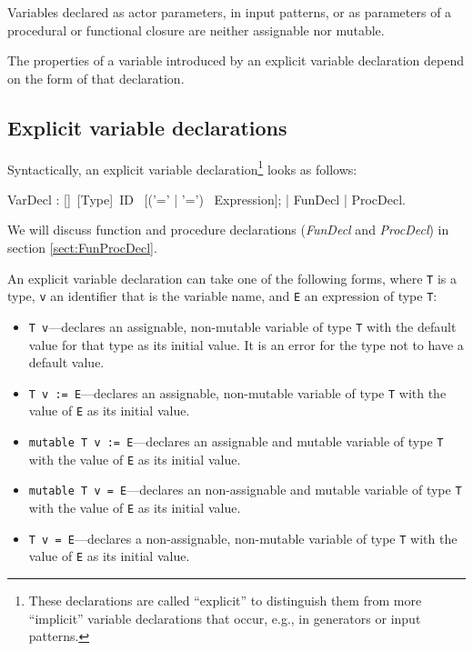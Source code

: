 Variables declared as actor parameters, in input patterns, or as
parameters of a procedural or functional closure are
neither assignable nor mutable.

The properties of a variable introduced by an explicit variable
declaration depend on the form of that declaration.

\subsection{Explicit variable declarations}\label{sect:ExplicitVarDecl}


Syntactically, an explicit variable declaration\footnote{These
  declarations are called ``explicit'' to distinguish them from more
  ``implicit'' variable declarations that occur, e.g., in generators
  or input patterns.} looks as follows:


\bgr
  VarDecl : [\kwMutable]~[Type]~ID ~[('=' | '\charColon=')
  ~Expression];
  | FunDecl | ProcDecl.
\egr


We will discuss function and procedure declarations ({\em FunDecl} and
{\em ProcDecl}) in section \ref{sect:FunProcDecl}.

An explicit variable declaration can take one of
the following forms, where {\tt T} is a type, {\tt v} an identifier
that is the variable name, and {\tt E} an expression of type {\tt T}:
\begin{itemize}
\item {\tt T v}---declares an assignable, non-mutable variable of type
  {\tt T} with the default value for that type as its initial
  value. It is an error for the type not to have a default value.
\item {\tt T v := E}---declares an assignable, non-mutable variable of
  type {\tt T} with the value of {\tt E} as its initial value.
\item {\tt mutable T v := E}---declares an assignable and mutable variable of
  type {\tt T} with the value of {\tt E} as its initial value.
\item {\tt mutable T v = E}---declares an non-assignable and mutable variable of
  type {\tt T} with the value of {\tt E} as its initial value.
\item {\tt T v = E}---declares a non-assignable, non-mutable variable of
  type {\tt T} with the value of {\tt E} as its initial value.
\end{itemize}


